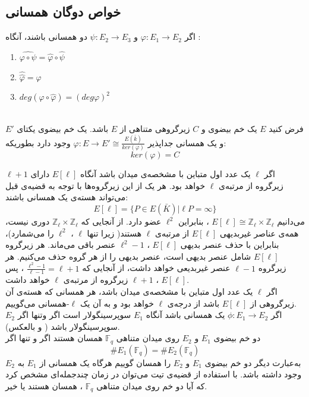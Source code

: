 \subsection{خواص دوگان همسانی}
اگر
$\varphi : E_1 \longrightarrow E_2$
و
$\psi : E_2 \longrightarrow E_3$
دو همسانی باشند، آنگاه :
\begin{enumerate}[label=\alph*.]
\item{
$ \widehat{\varphi \circ \psi} = \hat{\varphi} \circ \hat{\psi}$
}

\item{
$ \hat{ \hat{ \varphi } } = \varphi$
}
\item{
$ deg(\varphi \circ \hat{ \varphi }) = (deg \varphi)^2 $
}
\end{enumerate}~
\\
\theorem 
فرض کنید
$E$
یک خم بیضوی و 
$C$
زیرگروهی متناهی از 
$E$
باشد. یک خم بیضوی یکتای
$E'$
و یک همسانی جداپذیر
$\varphi : E \longrightarrow E' \cong \frac{E(\bar{k})}{ker(\varphi)}$
 وجود دارد بطوریکه:
$$ ker(\varphi) = C $$

\proposition
اگر
$\ell$
یک عدد اول متباین با مشخصه‌ی میدان باشد آنگاه 
$E[\ell]$
دارای 
$\ell + 1$
زیرگروه از مرتبه‌ی
$\ell$
خواهد بود. هر یک از این زیرگروه‌ها با توجه به قضیه‌ی قبل می‌تواند هسته‌ی یک همسانی باشند:
$$ E[\ell] = \{ P \in E(\bar{K}) | \ell P = \infty \} $$
می‌دانیم 
$E[\ell] \cong \mathbb{Z}_{\ell} \times \mathbb{Z}_{\ell}$
، بنابراین 
${\ell}^2$
عضو دارد. از آنجایی که
$\mathbb{Z}_{\ell} \times \mathbb{Z}_{\ell}$
دوری نیست، همه‌ی عناصر غیربدیهی 
$E[\ell]$
از مرتبه‌ی 
$\ell$
هستند( زیرا تنها 
$\ell$
،
${\ell}^2$
را می‌شمارد)، بنابراین با حذف عنصر بدیهی
$E[\ell]$
، 
${\ell}^2-1$
عنصر باقی می‌ماند. هر زیرگروه
$E[\ell]$
شامل عنصر بدیهی است، عنصر بدیهی را از هر گروه حذف می‌کنیم. هر زیرگروه 
$\ell -1$
عنصر غیربدیعی خواهد داشت، از آنجایی که
$\frac{{\ell}^2-1}{{\ell}-1} = \ell + 1$
، پس
$E[\ell]$
،
${\ell}+1$
زیرگروه از مرتبه‌ی
$\ell$
خواهد داشت.
\\
\proposition
اگر
$\ell$
یک عدد اول متباین با مشخصه‌ی میدان باشد، هر همسانی که هسته‌ی آن زیرگروهی از
$E[\ell]$
باشد از درجه‌ی 
$\ell$
خواهد بود و به آن یک 
$\ell$-همسانی
می‌گوییم.
\\
\theorem
اگر
$\phi : E_1 \longrightarrow E_2$
یک همسانی باشد آنگاه
$E_1$
سوپرسینگولار است اگر وتنها اگر
$E_2$
سوپرسینگولار باشد ( و بالعکس).
\\
\theorem[تیت]
دو خم بیضوی
$E_1$
و
$E_2$
روی میدان متناهی
$\mathbb{F}_q$
همسان هستند اگر و تنها اگر
$$ \# E_1(\mathbb{F}_q) = \# E_2(\mathbb{F}_q) $$
به‌عبارت دیگر دو خم بیضوی
$E_1$
و
$E_2$
را همسان گوییم هرگاه یک همسانی از
$E_1$
به
$E_2$
وجود داشته باشد.
\corollary
با استفاده از قضیه‌ی تیت می‌توان در زمان چندجمله‌ای مشخص کرد که آیا دو خم روی میدان متناهی
$\mathbb{F}_q$
، همسان هستند یا خیر.
\\
